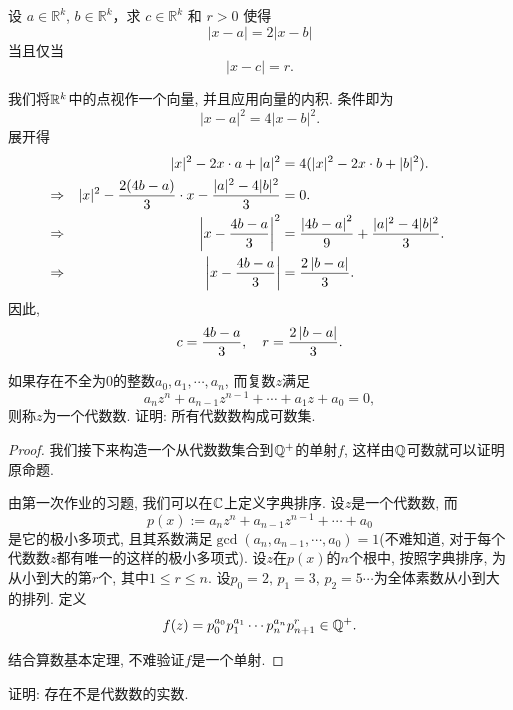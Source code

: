\documentclass{article}
\begin{document}
\begin{problem}[1-19]
设 \(a \in \mathbb{R}^k\), \(b \in \mathbb{R}^k\)，求 \(c \in \mathbb{R}^k\) 和 \(r > 0\) 使得
\[
|x - a| = 2|x - b|
\]
当且仅当
\[
|x - c| = r.
\]
\end{problem}

\begin{solution}
我们将$ \mathbb{R}^k $中的点视作一个向量, 并且应用向量的内积. 条件即为
\[
|x - a|^2 = 4|x - b|^2.
\]
展开得
\begin{align*}
& &|x|^2 - 2x\cdot a + |a|^2 &= 4(|x|^2 - 2x\cdot b + |b|^2).&&&&\\
&\Rightarrow&|x|^2 - \frac{2(4b - a)}{3}\cdot x - \frac{|a|^2 - 4|b|^2}{3} &= 0.&&&&\\
&\Rightarrow&\left|x - \frac{4b - a}{3}\right|^2 &= \frac{\left|4b-a\right|^2}{9} + \frac{|a|^2 - 4|b|^2}{3}.&&&&\\
&\Rightarrow&\left|x - \frac{4b - a}{3}\right| &= \frac{2\left|b-a\right|}{3}.&&&&\\
\end{align*}
因此, 
\[ c=\frac{4b-a}{3},\quad r=\frac{2\left|b-a\right|}{3}. \] 
\end{solution}

\begin{problem}[2-2]
    如果存在不全为\( 0 \)的整数\( a_0,a_1,\cdots,a_n \), 而复数\( z \)满足
    \[ a_nz^n+a_{n-1}z^{n-1}+\cdots+a_1z+a_0=0, \] 
    则称\( z \)为一个{\heiti 代数数}. 证明: 所有代数数构成可数集.
\end{problem}

\begin{proof}
    我们接下来构造一个从代数数集合到\( \mathbb{Q}^+ \)的单射\( f \), 这样由\( \mathbb{Q}  \)可数就可以证明原命题.\par
    由第一次作业的习题, 我们可以在\( \mathbb{C} \)上定义字典排序. 设\( z \)是一个代数数, 而
    \[ p(x):=a_nz^n+a_{n-1}z^{n-1}+\cdots+a_0 \] 
    是它的极小多项式, 且其系数满足\( \gcd(a_n,a_{n-1},\cdots,a_0)=1 \)(不难知道, 对于每个代数数\( z \)都有唯一的这样的极小多项式). 设\( z \)在\( p(x) \)的\( n \)个根中, 按照字典排序, 为从小到大的第\( r \)个, 其中\( 1\le r\le n \). 设\( p_0=2,\,p_1=3,\,p_2=5\cdots \)为全体素数从小到大的排列. 定义
    \[ f(z)=p_0^{a_0}p_1^{a_1}\cdots p_n^{a_n}p_{n+1}^r\in\mathbb{Q}^+ . \]\par
    结合算数基本定理, 不难验证\( f \)是一个单射. 
\end{proof}

\begin{problem}[2-3]
    证明: 存在不是代数数的实数.
\end{problem}
\end{document}
